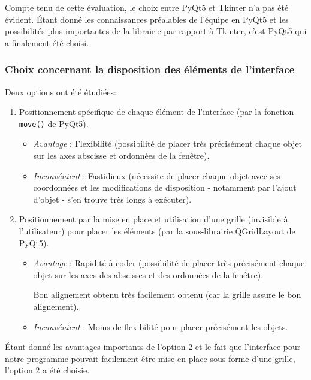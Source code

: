 \bigskip

Compte tenu de cette évaluation, le choix entre PyQt5 et Tkinter n’a pas été évident.
Étant donné les connaissances préalables de l'équipe en PyQt5 et les possibilités plus importantes
de la librairie par rapport à Tkinter, c’est PyQt5 qui a finalement été choisi.

\subsubsection{Choix concernant la disposition des éléments de l’interface}

Deux options ont été étudiées:

\begin{enumerate}
    \item Positionnement spécifique de chaque élément de l’interface (par la fonction \texttt{move()} de PyQt5).
    \begin{itemize}
        \item \emph{Avantage} : Flexibilité (possibilité de placer très précisément chaque objet sur les axes 
        abscisse et ordonnées de la fenêtre).
        \item \emph{Inconvénient} : Fastidieux (nécessite de placer chaque objet avec ses coordonnées et les 
        modifications de disposition - notamment par l’ajout d’objet - s’en trouve très longs à exécuter).
    \end{itemize}
    \item Positionnement par la mise en place et utilisation d’une grille (invisible à l'utilisateur) pour placer 
    les éléments (par la sous-librairie QGridLayout de PyQt5).
    \begin{itemize}
        \item \emph{Avantage} : Rapidité à coder (possibilité de placer très précisément chaque objet sur les 
        axes des abscisses et des ordonnées de la fenêtre).
        
        Bon alignement obtenu très facilement obtenu (car la grille assure le bon alignement).

        \item \emph{Inconvénient} :  Moins de flexibilité pour placer précisément les objets.

    \end{itemize}


\end{enumerate}

Étant donné les avantages importants de l’option 2 et le fait que l’interface pour notre programme pouvait facilement 
être mise en place sous forme d’une grille, l’option 2 a été choisie.


